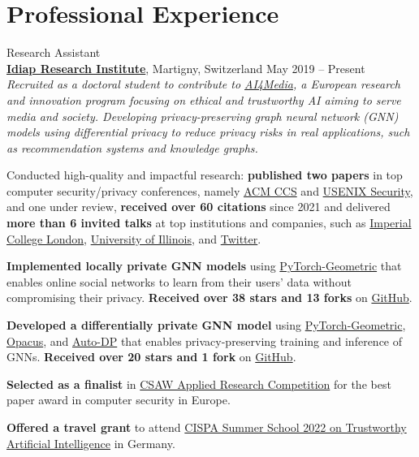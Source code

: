 \documentclass[10pt]{article}
\begin{document}
\section{Professional Experience}

\begin{outerlist}

	\item {Research Assistant}\\
	\textbf{\href{https://idiap.ch}{Idiap Research Institute}}, Martigny, Switzerland \hfill {May 2019 -- Present}\\
  \textit{Recruited as a doctoral student to contribute to \href{https://www.ai4media.eu/}{AI4Media}, a European research and innovation program focusing on ethical and trustworthy AI aiming to serve media and society. Developing privacy-preserving graph neural network (GNN) models using differential privacy to reduce privacy risks in real applications, such as recommendation systems and knowledge graphs.}
	\begin{innerlist}
		\item Conducted high-quality and impactful research: \textbf{published two papers} in top computer security/privacy conferences, namely \href{https://www.sigsac.org/ccs/CCS2021/}{ACM CCS} and \href{https://www.usenix.org/conference/usenixsecurity23/}{USENIX Security}, and one under review, \textbf{received over 60 citations} since 2021 and delivered \textbf{more than 6 invited talks} at top institutions and companies, such as \href{https://ix.imperial.ac.uk/}{Imperial College London}, \href{https://cs.uic.edu/}{University of Illinois}, and \href{https://twitter.com/}{Twitter}.
		\item \textbf{Implemented locally private GNN models} using \href{https://www.pyg.org/}{PyTorch-Geometric} that enables online social networks to learn from their users' data without compromising their privacy. \textbf{Received over 38 stars and 13 forks} on \href{https://github.com/sisaman/LPGNN}{GitHub}.
		\item \textbf{Developed a differentially private GNN model} using \href{https://www.pyg.org/}{PyTorch-Geometric}, \href{https://opacus.ai/}{Opacus}, and \href{https://github.com/yuxiangw/autodp}{Auto-DP} that enables privacy-preserving training and inference of GNNs. \textbf{Received over 20 stars and 1 fork} on \href{https://github.com/sisaman/GAP}{GitHub}.
		\item \textbf{Selected as a finalist} in \href{https://www.csaw.io/research}{CSAW Applied Research Competition} for the best paper award in computer security in Europe.
		\item \textbf{Offered a travel grant} to attend \href{https://cispa.de/en/summer-school-2022}{CISPA Summer School 2022 on Trustworthy Artificial Intelligence} in Germany.
	\end{innerlist}


\end{outerlist}
\end{document}
